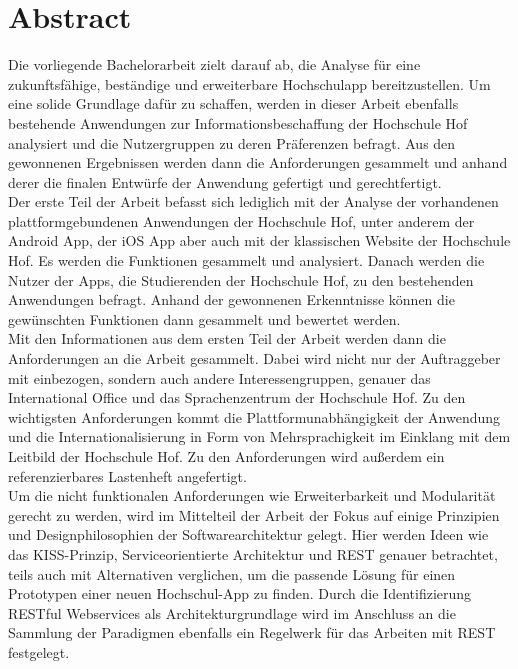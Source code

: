 \thispagestyle{empty}

\section*{Abstract}
Die vorliegende Bachelorarbeit zielt darauf ab, die Analyse für eine zukunftsfähige, beständige und erweiterbare Hochschulapp bereitzustellen. Um eine solide Grundlage dafür zu schaffen, werden in dieser Arbeit ebenfalls bestehende Anwendungen zur Informationsbeschaffung der Hochschule Hof analysiert und die Nutzergruppen zu deren Präferenzen  befragt. Aus den gewonnenen Ergebnissen werden dann die Anforderungen gesammelt und anhand derer die finalen Entwürfe der Anwendung gefertigt und gerechtfertigt.\\
Der erste Teil der Arbeit befasst sich lediglich mit der Analyse der vorhandenen plattformgebundenen Anwendungen der Hochschule Hof, unter anderem der Android App, der iOS App aber auch mit der klassischen Website der Hochschule Hof. Es werden die Funktionen gesammelt und analysiert. Danach werden die Nutzer der Apps, die Studierenden der Hochschule Hof, zu den bestehenden Anwendungen befragt. Anhand der gewonnenen Erkenntnisse können die gewünschten Funktionen dann gesammelt und bewertet werden.\\
Mit den Informationen aus dem ersten Teil der Arbeit werden dann die Anforderungen an die Arbeit gesammelt. Dabei wird nicht nur der Auftraggeber mit einbezogen, sondern auch andere Interessengruppen, genauer das International Office und das Sprachenzentrum der Hochschule Hof. Zu den wichtigsten Anforderungen kommt die Plattformunabhängigkeit der Anwendung und die Internationalisierung in Form von Mehrsprachigkeit im Einklang mit dem Leitbild der Hochschule Hof. Zu den Anforderungen wird außerdem ein referenzierbares Lastenheft angefertigt.\\
Um die nicht funktionalen Anforderungen wie Erweiterbarkeit und Modularität gerecht zu werden, wird im Mittelteil der Arbeit der Fokus auf einige Prinzipien und Designphilosophien der Softwarearchitektur gelegt. Hier werden Ideen wie das KISS-Prinzip, Serviceorientierte Architektur und REST  genauer betrachtet, teils auch mit Alternativen verglichen, um die passende Lösung für einen Prototypen einer neuen Hochschul-App zu finden. Durch die Identifizierung RESTful Webservices als Architekturgrundlage wird im Anschluss an die Sammlung der Paradigmen ebenfalls ein Regelwerk für das Arbeiten mit REST festgelegt.\\
